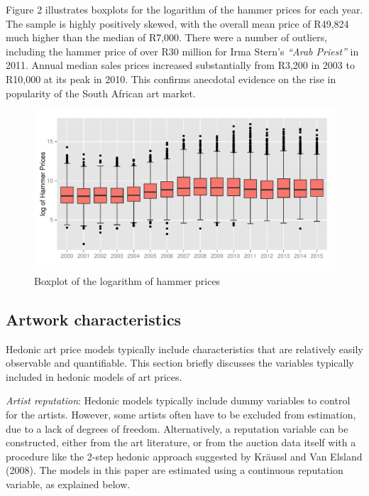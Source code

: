 \documentclass[12pt,]{article}
\begin{document}
Figure 2 illustrates boxplots for the logarithm of the hammer prices for
each year. The sample is highly positively skewed, with the overall mean
price of R49,824 much higher than the median of R7,000. There were a
number of outliers, including the hammer price of over R30 million for
Irma Stern's \emph{``Arab Priest''} in 2011. Annual median sales prices
increased substantially from R3,200 in 2003 to R10,000 at its peak in
2010. This confirms anecdotal evidence on the rise in popularity of the
South African art market.

\begin{figure}[htbp]
\centering
\includegraphics{./tex2pdf.15156/5dc54430024651a97e1e9f01cc30cdef606939f9.pdf}
\caption{Boxplot of the logarithm of hammer prices}
\end{figure}

\subsection{Artwork characteristics}\label{artwork-characteristics}

Hedonic art price models typically include characteristics that are
relatively easily observable and quantifiable. This section briefly
discusses the variables typically included in hedonic models of art
prices.

\emph{Artist reputation}: Hedonic models typically include dummy
variables to control for the artists. However, some artists often have
to be excluded from estimation, due to a lack of degrees of freedom.
Alternatively, a reputation variable can be constructed, either from the
art literature, or from the auction data itself with a procedure like
the 2-step hedonic approach suggested by Kräussl and Van Elsland (2008).
The models in this paper are estimated using a continuous reputation
variable, as explained below.
\end{document}
